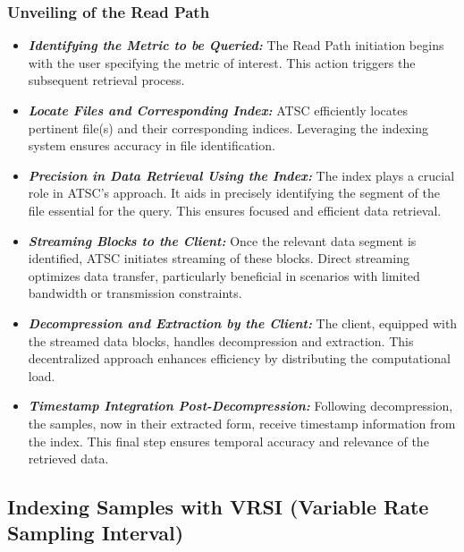 \documentclass[conference]{IEEEtran}
\begin{document}
\subsubsection{Unveiling of the Read Path}\label{SCM}
\begin{itemize}

\item{\textbf{\textit{Identifying the Metric to be Queried:}}} The Read Path initiation begins with the user specifying the metric of interest. This action triggers the subsequent retrieval process.
\vspace{5pt}

\item{\textbf{\textit{Locate Files and Corresponding Index:}}} ATSC efficiently locates pertinent file(s) and their corresponding indices. Leveraging the indexing system ensures accuracy in file identification.
\vspace{5pt}
\item{\textbf{\textit{Precision in Data Retrieval Using the Index:}}} The index plays a crucial role in ATSC's approach. It aids in precisely identifying the segment of the file essential for the query. This ensures focused and efficient data retrieval.
\vspace{5pt}
\item{\textbf{\textit{Streaming Blocks to the Client:}}} Once the relevant data segment is identified, ATSC initiates streaming of these blocks. Direct streaming optimizes data transfer, particularly beneficial in scenarios with limited bandwidth or transmission constraints.
\vspace{5pt}
\item{\textbf{\textit{Decompression and Extraction by the Client:}}} The client, equipped with the streamed data blocks, handles decompression and extraction. This decentralized approach enhances efficiency by distributing the computational load.
\vspace{5pt}
\item{\textbf{\textit{Timestamp Integration Post-Decompression:}}} Following decompression, the samples, now in their extracted form, receive timestamp information from the index. This final step ensures temporal accuracy and relevance of the retrieved data.
\end{itemize}

\subsection{Indexing Samples with VRSI (Variable Rate Sampling Interval)}
\end{document}
